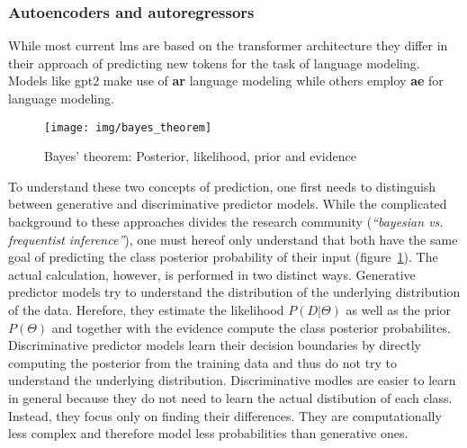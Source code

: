 \subsubsection{Autoencoders and autoregressors}
\label{sub:autoencoders_and_autoregressors}

While most current \gls{lm}s are based on the transformer architecture they differ in their approach of predicting new tokens for the task of language modeling. Models like \gls{gpt2} make use of \textbf{\gls{ar}} language modeling while others employ \textbf{\gls{ae}} for language modeling.

\begin{figure}
	\texttt{[image: img/bayes\_theorem]}
	\caption{Bayes' theorem: Posterior, likelihood, prior and evidence}
	\label{fig:bayes_theorem}
\end{figure}

To understand these two concepts of prediction, one first needs to distinguish between generative and discriminative predictor models. While the complicated background to these approaches divides the research community (\textit{``bayesian vs. frequentist inference''}), one must hereof only understand that both have the same goal of predicting the class posterior probability of their input (figure~\ref{fig:bayes_theorem}). The actual calculation, however, is performed in two distinct ways. Generative predictor models try to understand the distribution of the underlying distribution of the data. Herefore, they estimate the likelihood $ P(D|\Theta) $ as well as the prior $ P(\Theta) $ and together with the evidence compute the class posterior probabilites. Discriminative predictor models learn their decision boundaries by directly computing the posterior from the training data and thus do not try to understand the underlying distribution. Discriminative modles are easier to learn in general because they do not need to learn the actual distibution of each class. Instead, they focus only on finding their differences. They are computationally less complex and therefore model less probabilities than generative ones.

